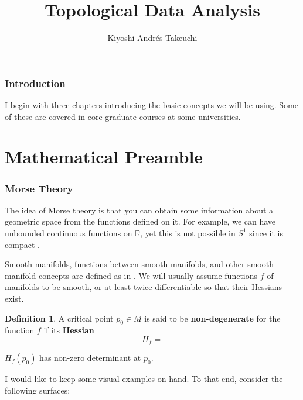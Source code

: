 \documentclass[]{article}
\theoremstyle{definition}
\newtheorem*{definition}{Definition}
\theoremstyle{definition}
\begin{document}
	
	\begin{titlepage}
		
		\title{%
			\textbf{Topological Data Analysis}
		}
		
		\author{Kiyoshi Andrés Takeuchi}
		\maketitle
		
	\end{titlepage}

\tableofcontents


\section*{Introduction}

I begin with three chapters introducing the basic concepts we will be using. Some of these are covered in core graduate courses at some universities.
	
\part{Mathematical Preamble}	

\section{Morse Theory}

The idea of Morse theory is that you can obtain some information about a geometric space from the functions defined on it. For example, we can have unbounded continuous functions on $\mathbb{R}$, yet this is not possible in $S^1$ since it is compact \cite{matsumoto2002introduction}.

Smooth manifolds, functions between smooth manifolds, and other smooth manifold concepts are defined as in \cite[150]{lee2003introduction}. We will usually assume functions $f$ of manifolds to be smooth, or at least twice differentiable so that their Hessians exist.

\begin{definition}
	A critical point $p_0\in M$ is said to be \textbf{non-degenerate} for the function $f$ if its \textbf{Hessian} 
	\begin{equation}
		H_f=
	\end{equation}
	
	
	$H_f(p_0)$ has non-zero determinant at $p_0$.
\end{definition}

I would like to keep some visual examples on hand. To that end, consider the following surfaces:
\end{document}
